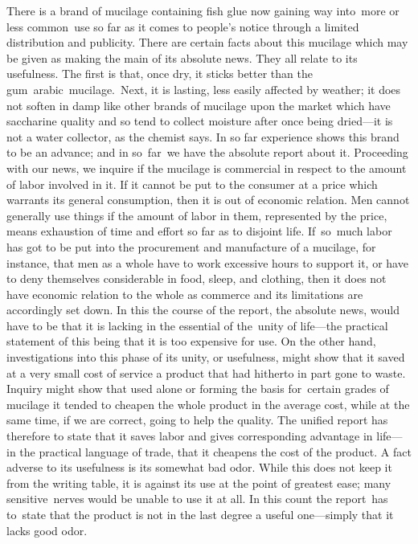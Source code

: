 \documentclass[openany,nobib]{tufte-book}
\begin{document}
There is a brand of mucilage containing fish glue now gaining way
into~more or less common~use so far as it comes to people's notice
through a limited distribution and publicity. There are certain facts
about this mucilage which may be given as making the main of its
absolute news. They all relate to its usefulness. The first is that,
once dry, it sticks better than the gum~arabic~mucilage.~Next, it is
lasting, less easily affected by weather; it does not soften in damp
like other brands of mucilage upon the market which have saccharine
quality and so tend to collect moisture after once being dried---it is
not a water collector, as the chemist says. In so far experience shows
this brand to be an advance; and in so~far~we have the absolute report
about it. Proceeding with our news, we inquire if the mucilage is
commercial in respect to the amount of labor involved in it. If it
cannot be put to the consumer at a price which warrants its general
consumption, then it is out of economic relation. Men cannot generally
use things if the amount of labor in them, represented by the price,
means exhaustion of time and effort so far as to disjoint life.
If~so~much labor has got to be put into the procurement and manufacture
of a mucilage, for instance, that men as a whole have to work excessive
hours to support it, or have to deny themselves considerable in food,
sleep, and clothing, then it does not have economic relation to the
whole as commerce and its limitations are accordingly set down. In this
the course of the report, the absolute news, would have to be that it is
lacking in the essential of the~unity of life---the practical statement
of this being that it is too expensive for use. On the other hand,
investigations into this phase of its unity, or usefulness, might show
that it saved at a very small cost of service a product that had
hitherto in part gone to waste. Inquiry might show that used alone or
forming the basis for~certain grades of mucilage it tended to cheapen
the whole product in the average cost, while at the same time, if we are
correct, going to help the quality. The unified report has therefore to
state that it saves labor and gives corresponding advantage in life---in
the practical language of trade, that it cheapens the cost of the
product. A fact adverse to its usefulness is its somewhat bad odor.
While this does not keep it from the writing table, it is against its
use at the point of greatest ease; many sensitive~nerves would be unable
to use it at all. In this count the report~has to~state that the product
is not in the last degree a useful one---simply that it lacks good odor.
\end{document}

